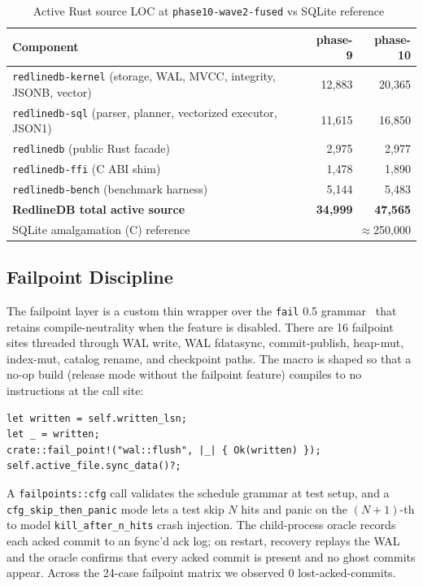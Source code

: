 \begin{table}[t]
\centering
\caption{Active Rust source LOC at \texttt{phase10-wave2-fused} vs SQLite reference~\cite{sqlite_footprint}}
\label{tab:loc}
\renewcommand{\arraystretch}{1.05}
\begin{tabular}{@{}lrr@{}}
\toprule
\textbf{Component} & \textbf{phase-9} & \textbf{phase-10} \\
\midrule
\texttt{redlinedb-kernel} (storage, WAL, MVCC, integrity, JSONB, vector) & 12{,}883 & 20{,}365 \\
\texttt{redlinedb-sql} (parser, planner, vectorized executor, JSON1) & 11{,}615 & 16{,}850 \\
\texttt{redlinedb} (public Rust facade) & 2{,}975 & 2{,}977 \\
\texttt{redlinedb-ffi} (C ABI shim) & 1{,}478 & 1{,}890 \\
\texttt{redlinedb-bench} (benchmark harness) & 5{,}144 & 5{,}483 \\
\midrule
\textbf{RedlineDB total active source} & \textbf{34{,}999} & \textbf{47{,}565} \\
\midrule
SQLite amalgamation (C) reference & \multicolumn{2}{r}{$\approx$250{,}000} \\
\bottomrule
\end{tabular}
\end{table}

\subsection{Failpoint Discipline}
The failpoint layer is a custom thin wrapper over the
\texttt{fail} 0.5 grammar~\cite{failrs} that retains
compile-neutrality when the feature is disabled. There are 16
failpoint sites threaded through WAL write, WAL fdatasync,
commit-publish, heap-mut, index-mut, catalog rename, and
checkpoint paths. The macro is shaped so that a no-op build
(release mode without the failpoint feature) compiles to no
instructions at the call site:

\begin{lstlisting}
let written = self.written_lsn;
let _ = written;
crate::fail_point!("wal::flush", |_| { Ok(written) });
self.active_file.sync_data()?;
\end{lstlisting}

A \texttt{failpoints::cfg} call validates the schedule grammar at
test setup, and a \texttt{cfg\_skip\_then\_panic} mode lets a test
skip $N$ hits and panic on the $(N+1)$-th to model
\texttt{kill\_after\_n\_hits} crash injection. The child-process
oracle records each acked commit to an fsync'd ack log; on restart,
recovery replays the WAL and the oracle confirms that every acked
commit is present and no ghost commits appear. Across the 24-case
failpoint matrix we observed 0 lost-acked-commits.


